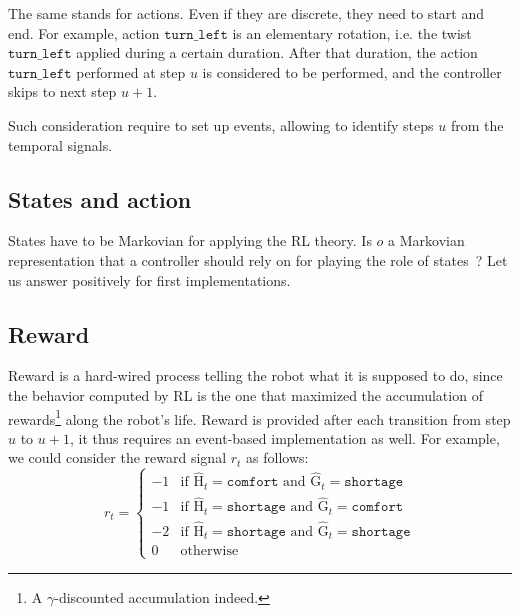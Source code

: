 \documentclass[10pt,a4paper]{article}
\newcommand{\At}[2]{#1_{#2}}
\newcommand{\AtT}[1]{\At{#1}t}
\newcommand{\Hydro}[0]{\mathrm{H}}
\newcommand{\Glyco}[0]{\mathrm{G}}
\newcommand{\Discr}[1]{\widehat{#1}}
\newcommand{\Label}[1]{\mathtt{#1}}
\newcommand{\Comfort}[0]{\Label{comfort}}
\newcommand{\Shortage}[0]{\Label{shortage}}
\newcommand{\TurnLeft}[0]{\Label{turn\_left}}
\newcommand{\Obs}{o}
\newcommand{\Rew}{r}
\begin{document}
The same stands for actions. Even if they are discrete, they need to start and end. For example, action $\TurnLeft$ is an elementary rotation, i.e. the twist $\TurnLeft$ applied during a certain duration. After that duration, the action $\TurnLeft$ performed at step $u$ is considered to be performed, and the controller skips to next step $u+1$.

Such consideration require to set up events, allowing to identify steps $u$ from the temporal signals.

\subsection{States and action}

States have to be Markovian for applying the RL theory. Is $\Obs$ a Markovian representation that a controller should rely on for playing the role of states~? Let us answer positively for first implementations.

\subsection{Reward}

Reward is a hard-wired process telling the robot what it is supposed to do, since the behavior computed by RL is the one that maximized the accumulation of rewards\footnote{A $\gamma$-discounted accumulation indeed.} along the robot's life. Reward is provided after each transition from step $u$ to $u+1$, it thus requires an event-based implementation as well. For example, we could consider the reward signal $\AtT \Rew$ as follows:
\begin{equation}
\AtT \Rew = \left\{\begin{array}{ll}
-1 & \mbox{if } \AtT {\Discr{\Hydro}} = \Comfort \mbox{ and } \AtT {\Discr{\Glyco}} = \Shortage \\
-1 & \mbox{if } \AtT {\Discr{\Hydro}} = \Shortage \mbox{ and } \AtT {\Discr{\Glyco}} = \Comfort \\
-2 & \mbox{if } \AtT {\Discr{\Hydro}} = \Shortage \mbox{ and } \AtT {\Discr{\Glyco}} = \Shortage \\
0 & \mbox{otherwise}
\end{array}\right.
\end{equation}
\end{document}
